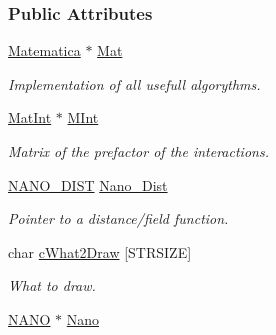 \subsubsection*{\-Public \-Attributes}
\begin{DoxyCompactItemize}
\item 
\hypertarget{classVarData_aab4995eedc5bb0d45d86f0e2a5d0e869}{\hyperlink{classMatematica}{\-Matematica} $\ast$ \hyperlink{classVarData_aab4995eedc5bb0d45d86f0e2a5d0e869}{\-Mat}}\label{classVarData_aab4995eedc5bb0d45d86f0e2a5d0e869}

\begin{DoxyCompactList}\small\item\em \-Implementation of all usefull algorythms. \end{DoxyCompactList}\item 
\hypertarget{classVarData_a7bb96647a8e4b53477394d2538fdfb3f}{\hyperlink{classMatInt}{\-Mat\-Int} $\ast$ \hyperlink{classVarData_a7bb96647a8e4b53477394d2538fdfb3f}{\-M\-Int}}\label{classVarData_a7bb96647a8e4b53477394d2538fdfb3f}

\begin{DoxyCompactList}\small\item\em \-Matrix of the prefactor of the interactions. \end{DoxyCompactList}\item 
\hypertarget{classVarData_a5272af22ca77a745a6e86cd6b4f23ccf}{\hyperlink{classVarData_aea7b2bfbbf53c129db630b86e42af630}{\-N\-A\-N\-O\-\_\-\-D\-I\-S\-T} \hyperlink{classVarData_a5272af22ca77a745a6e86cd6b4f23ccf}{\-Nano\-\_\-\-Dist}}\label{classVarData_a5272af22ca77a745a6e86cd6b4f23ccf}

\begin{DoxyCompactList}\small\item\em \-Pointer to a distance/field function. \end{DoxyCompactList}\item 
\hypertarget{classVarData_a7c997cd3acaf56afc44e01680323eb0e}{char \hyperlink{classVarData_a7c997cd3acaf56afc44e01680323eb0e}{c\-What2\-Draw} \mbox{[}\-S\-T\-R\-S\-I\-Z\-E\mbox{]}}\label{classVarData_a7c997cd3acaf56afc44e01680323eb0e}

\begin{DoxyCompactList}\small\item\em \-What to draw. \end{DoxyCompactList}\item 
\hypertarget{classVarData_aee5ea3e3c08ea9745e40192350f5d14b}{\hyperlink{structNANO}{\-N\-A\-N\-O} $\ast$ \hyperlink{classVarData_aee5ea3e3c08ea9745e40192350f5d14b}{\-Nano}}\label{classVarData_aee5ea3e3c08ea9745e40192350f5d14b}


\end{DoxyCompactItemize}
